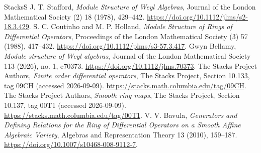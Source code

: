 \documentclass[11pt,a4paper]{article}
\begin{document}
\begin{thebibliography}{StacksS}
 J. T. Stafford, \emph{Module Structure of Weyl Algebras}, Journal of the London Mathematical Society (2) 18 (1978), 429–442. \url{https://doi.org/10.1112/jlms/s2-18.3.429}.
 S. C. Coutinho and M. P. Holland, \emph{Module Structure of Rings of Differential Operators}, Proceedings of the London Mathematical Society (3) 57 (1988), 417–432. \url{https://doi.org/10.1112/plms/s3-57.3.417}.
 Gwyn Bellamy, \emph{Module structure of Weyl algebras}, Journal of the London Mathematical Society 113 (2026), no. 1, e70373. \url{https://doi.org/10.1112/jlms.70373}.
 The Stacks Project Authors, \emph{Finite order differential operators}, The Stacks Project, Section 10.133, tag 09CH (accessed 2026-09-09). \url{https://stacks.math.columbia.edu/tag/09CH}.
 The Stacks Project Authors, \emph{Smooth ring maps}, The Stacks Project, Section 10.137, tag 00T1 (accessed 2026-09-09). \url{https://stacks.math.columbia.edu/tag/00T1}.
 V. V. Bavula, \emph{Generators and Defining Relations for the Ring of Differential Operators on a Smooth Affine Algebraic Variety}, Algebras and Representation Theory 13 (2010), 159–187. \url{https://doi.org/10.1007/s10468-008-9112-7}.
\end{thebibliography}
\end{document}
